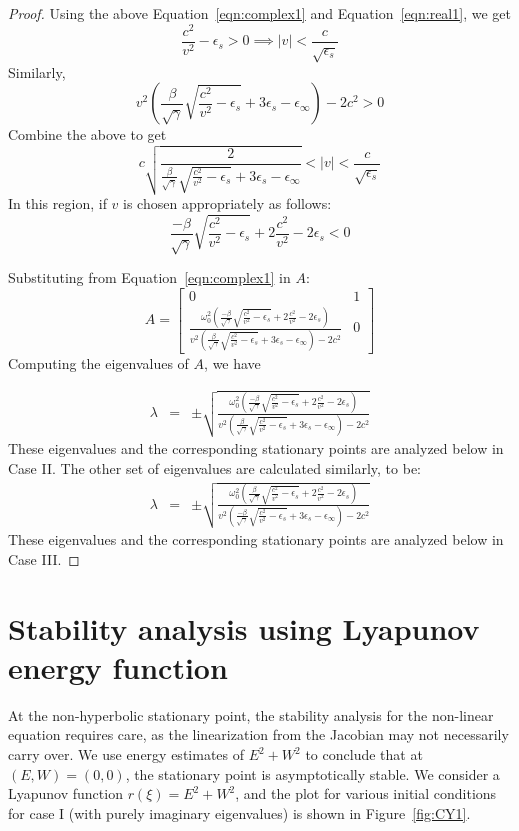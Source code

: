 \documentclass{article}[12pt]
\theoremstyle{plain}
\begin{document}
\begin{proof}
Using the above Equation~\ref{eqn:complex1} and Equation~\ref{eqn:real1}, we get
\[
\frac{c^2}{v^2} - \epsilon_s > 0 \implies |v| < \frac{c}{\sqrt{\epsilon_s}}
\]
Similarly,
\begin{equation}
v^2(\frac{\beta}{\sqrt{\gamma}}\sqrt{\frac{c^2}{v^2}-\epsilon_s} + 3\epsilon_s - \epsilon_\infty) - 2c^2 > 0
\end{equation}
Combine the above to get
\begin{equation}
c\sqrt{\frac{2}{\frac{\beta}{\sqrt{\gamma}}\sqrt{\frac{c^2}{v^2}-\epsilon_s} + 3\epsilon_s - \epsilon_\infty}}  < |v| <  \frac{c}{\sqrt{\epsilon_s}} \label{eqn:ineq}
\end{equation}
In this region, if $v$ is chosen appropriately as follows:
\[
\frac{-\beta}{\sqrt{\gamma}}\sqrt{\frac{c^2}{v^2}-\epsilon_s} + 2\frac{c^2}{v^2} - 2\epsilon_s < 0
\]

Substituting from Equation~\ref{eqn:complex1} in $A$:
\[
A = \begin{bmatrix} 0 & 1 \\
\frac{\omega_0^2 (\frac{-\beta}{\sqrt{\gamma}}\sqrt{\frac{c^2}{v^2}-\epsilon_s} + 2\frac{c^2}{v^2} - 2\epsilon_s)}
{v^2(\frac{\beta}{\sqrt{\gamma}}\sqrt{\frac{c^2}{v^2}-\epsilon_s} + 3\epsilon_s - \epsilon_\infty) -2c^2}& 0
\end{bmatrix}
\]
Computing the eigenvalues of $A$, we have

\begin{eqnarray}
\lambda & = & \pm \sqrt{\frac{\omega_0^2 (\frac{-\beta}{\sqrt{\gamma}}\sqrt{\frac{c^2}{v^2}-\epsilon_s} + 2\frac{c^2}{v^2} - 2\epsilon_s)}
{v^2(\frac{\beta}{\sqrt{\gamma}}\sqrt{\frac{c^2}{v^2}-\epsilon_s} + 3\epsilon_s - \epsilon_\infty) -2c^2}} \label{eqn:caseII}
\end{eqnarray}
These eigenvalues and the corresponding stationary points are analyzed below in Case II.
The other set of eigenvalues are calculated similarly, to be:
\begin{eqnarray}
\lambda & = & \pm \sqrt{\frac{\omega_0^2 (\frac{\beta}{\sqrt{\gamma}}\sqrt{\frac{c^2}{v^2}-\epsilon_s} + 2\frac{c^2}{v^2} - 2\epsilon_s)}
{v^2(\frac{-\beta}{\sqrt{\gamma}}\sqrt{\frac{c^2}{v^2}-\epsilon_s} + 3\epsilon_s - \epsilon_\infty) -2c^2}} \label{eqn:caseIII}
\end{eqnarray}
These eigenvalues and the corresponding stationary points are analyzed below in Case III.
\end{proof}

\section{Stability analysis using Lyapunov energy function}
At the non-hyperbolic stationary point, the stability analysis for the non-linear equation requires care, as the linearization
from the Jacobian may not necessarily carry over. We use energy estimates of $E^2+W^2$ to conclude that at $(E,W)=(0,0)$, the
stationary point is asymptotically stable. We consider a Lyapunov function $r(\xi)=E^2+W^2$, and the plot for various initial
conditions for case I (with purely imaginary eigenvalues) is shown in Figure~\ref{fig:CY1}.
\end{document}
